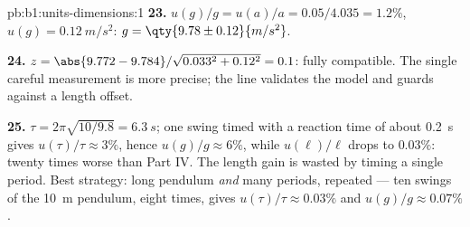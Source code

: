 \begin{solution}{pb:b1:units-dimensions:1}
\textbf{23.} $u(g)/g = u(a)/a = 0.05/4.035 = 1.2\%$, $u(g) =
\qty{0.12}{m/s^2}$: $g = \qty{9.78\pm0.12}{m/s^2}$.

\textbf{24.} $z = \abs{9.772 - 9.784}/\sqrt{0.033^2 + 0.12^2} = 0.1$:
fully compatible. The single careful measurement is more precise; the
line validates the model and guards against a length offset.

\textbf{25.} $\tau = 2\pi\sqrt{10/9.8} = \qty{6.3}{s}$; one swing timed
with a reaction time of about \qty{0.2}{s} gives $u(\tau)/\tau \approx
3\%$, hence $u(g)/g \approx 6\%$, while $u(\ell)/\ell$ drops to
$0.03\%$: twenty times worse than Part IV. The length gain is wasted by
timing a single period. Best strategy: long pendulum \emph{and} many
periods, repeated --- ten swings of the \qty{10}{m} pendulum, eight
times, gives $u(\tau)/\tau \approx 0.03\%$ and $u(g)/g \approx 0.07\%$.
\end{solution}
